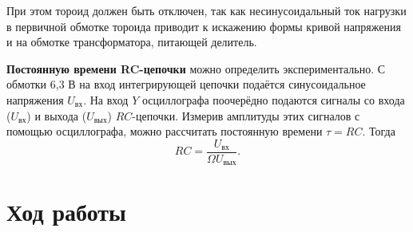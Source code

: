 \documentclass[a4paper, 12pt]{article}
\begin{document}
        При этом тороид должен быть отключен, так как несинусоидальный ток нагрузки в первичной обмотке тороида приводит к искажению формы кривой напряжения и на обмотке трансформатора, питающей делитель.

        \textbf{Постоянную времени RC-цепочки} можно определить экспериментально. С обмотки 6,3 В на вход интегрирующей цепочки подаётся синусоидальное напряжения $U_{\text{вх}}$. На вход $Y$ осциллографа поочерёдно подаются сигналы со входа ($U_{\text{вх}}$) и выхода ($U_{\text{вых}}$) $RC$-цепочки. Измерив амплитуды этих сигналов с помощью осциллографа, можно рассчитать постоянную времени $\tau=RC$. Тогда\[RC=\frac{U_{\text{вх}}}{\Omega U_{\text{вых}}}.\]

    \section{Ход работы}
\end{document}
